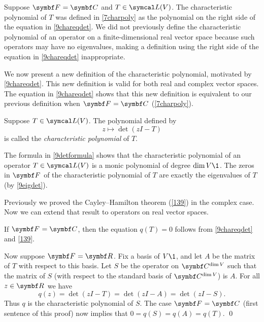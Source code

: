 Suppose $\F{} = \C{}$ and $T \in \L(V)$. The characteristic polynomial of $T$ was defined in \ref{7charpoly} as the polynomial on the right side of the equation in \ref{9chareqdet}. We did not previously define the characteristic polynomial of an operator on a finite-dimensional real vector space because such operators may have no eigenvalues, making a definition using the right side of the equation in \ref{9chareqdet} inappropriate.

We now present a new definition of the characteristic polynomial, motivated by \ref{9chareqdet}. This new definition is valid for both real and complex vector spaces. The equation in \ref{9chareqdet} shows that this new definition is equivalent to our previous definition when $\F{} = \C{}$ (\ref{7charpoly}).

{Suppose $T \in \L(V)$. The polynomial defined by
\[
z \mapsto \det(zI - T)
\]
is called the \emph{characteristic polynomial} of $T$.}

The formula in \ref{9detformula} shows that the characteristic polynomial of an operator \mbox{$T \in \L(V)$} is a monic polynomial of degree
$\dim V\1$. The zeros in $\F{}$ of the characteristic polynomial of $T$ are exactly the eigenvalues of $T$ (by \ref{9eigdet}).

Previously we proved the Cayley--Hamilton theorem (\ref{139}) in the complex case. Now we can extend that result to operators on real vector spaces.


\proof
If $\F{} = \C{}$, then the equation $q(T) = 0$ follows from \ref{9chareqdet} and \ref{139}.

Now suppose $\F{} = \R{}$. Fix a basis of $V\1$, and let $A$ be the matrix of $T$ with respect to this basis. Let $S$ be the operator on
$\C {\dim V}$ such that the matrix of $S$ \big(with respect to the standard basis of $\C {\dim V}$\big) is $A$. For all $z \in \R{}$ we have
\[
q(z) = \det(zI - T) = \det(zI - A) = \det(zI - S).
\]
Thus $q$ is the characteristic polynomial of $S$. The case $\F{} = \C{}$ (first sentence of this proof) now implies that $0 = q(S) = q(A) = q(T)$.
\qed



